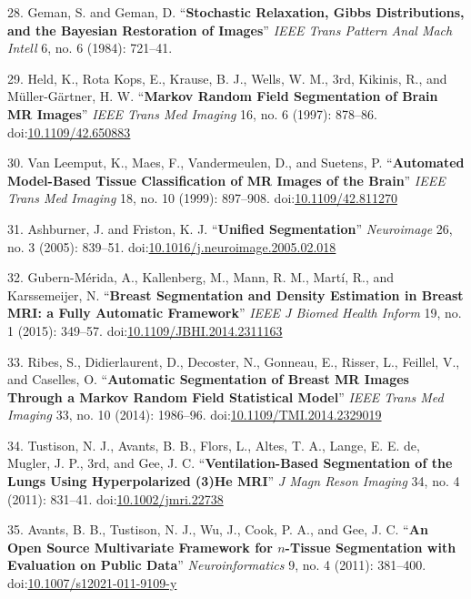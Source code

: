 \documentclass[11pt,]{article}
\begin{document}
28. Geman, S. and Geman, D. ``\textbf{Stochastic Relaxation, Gibbs
Distributions, and the Bayesian Restoration of Images}'' \emph{IEEE
Trans Pattern Anal Mach Intell} 6, no. 6 (1984): 721--41.

29. Held, K., Rota Kops, E., Krause, B. J., Wells, W. M., 3rd, Kikinis,
R., and M{ü}ller-G{ä}rtner, H. W. ``\textbf{Markov Random Field
Segmentation of Brain MR Images}'' \emph{IEEE Trans Med Imaging} 16, no.
6 (1997): 878--86.
doi:\href{http://dx.doi.org/10.1109/42.650883}{10.1109/42.650883}

30. Van Leemput, K., Maes, F., Vandermeulen, D., and Suetens, P.
``\textbf{Automated Model-Based Tissue Classification of MR Images of
the Brain}'' \emph{IEEE Trans Med Imaging} 18, no. 10 (1999): 897--908.
doi:\href{http://dx.doi.org/10.1109/42.811270}{10.1109/42.811270}

31. Ashburner, J. and Friston, K. J. ``\textbf{Unified Segmentation}''
\emph{Neuroimage} 26, no. 3 (2005): 839--51.
doi:\href{http://dx.doi.org/10.1016/j.neuroimage.2005.02.018}{10.1016/j.neuroimage.2005.02.018}

32. Gubern-M{é}rida, A., Kallenberg, M., Mann, R. M., Mart{í}, R., and
Karssemeijer, N. ``\textbf{Breast Segmentation and Density Estimation in
Breast MRI: a Fully Automatic Framework}'' \emph{IEEE J Biomed Health
Inform} 19, no. 1 (2015): 349--57.
doi:\href{http://dx.doi.org/10.1109/JBHI.2014.2311163}{10.1109/JBHI.2014.2311163}

33. Ribes, S., Didierlaurent, D., Decoster, N., Gonneau, E., Risser, L.,
Feillel, V., and Caselles, O. ``\textbf{Automatic Segmentation of Breast
MR Images Through a Markov Random Field Statistical Model}'' \emph{IEEE
Trans Med Imaging} 33, no. 10 (2014): 1986--96.
doi:\href{http://dx.doi.org/10.1109/TMI.2014.2329019}{10.1109/TMI.2014.2329019}

34. Tustison, N. J., Avants, B. B., Flors, L., Altes, T. A., Lange, E.
E. de, Mugler, J. P., 3rd, and Gee, J. C. ``\textbf{Ventilation-Based
Segmentation of the Lungs Using Hyperpolarized (3)He MRI}'' \emph{J Magn
Reson Imaging} 34, no. 4 (2011): 831--41.
doi:\href{http://dx.doi.org/10.1002/jmri.22738}{10.1002/jmri.22738}

35. Avants, B. B., Tustison, N. J., Wu, J., Cook, P. A., and Gee, J. C.
``\textbf{An Open Source Multivariate Framework for $n$-Tissue
Segmentation with Evaluation on Public Data}'' \emph{Neuroinformatics}
9, no. 4 (2011): 381--400.
doi:\href{http://dx.doi.org/10.1007/s12021-011-9109-y}{10.1007/s12021-011-9109-y}
\end{document}

